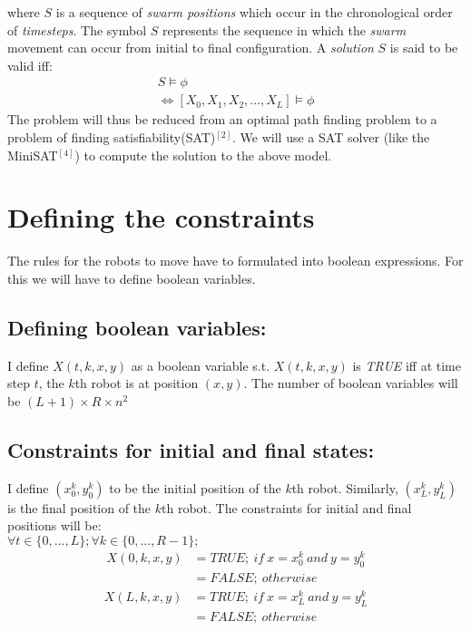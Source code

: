 \documentclass{article}[11pt]
\begin{document}
		where $S$ is a sequence of \textit{swarm positions} which occur in the chronological order of \textit{timesteps}.
		The symbol $S$ represents the sequence in which the \textit{swarm} movement can occur from initial to final configuration.
		A \textit{solution} $S$ is said to be valid iff:
		\begin{gather}
				S \models \phi \\
			\Leftrightarrow  [X_0, X_1, X_2, . . . , X_L] \models \phi
		\end{gather}
		The problem will thus be reduced from an optimal path finding problem to a problem of finding satisfiability(SAT)$^{[2]}$. 
		We will use a SAT solver (like the MiniSAT$^{[4]}$) to compute the solution to the above model.

	\section{Defining the constraints}
		The rules for the robots to move have to formulated into boolean expressions. For this we will have to define boolean variables.
		\subsection{Defining boolean variables:}
			I define $X(t, k, x, y)$ as a boolean variable s.t. $X(t, k, x, y)$ is \textit{TRUE} iff at time step $t$, the $k$th robot is at position $(x,y)$. The number of boolean variables will be $(L+1) \times R \times n^2$
		
		\subsection{Constraints for initial and final states:}
			I define $(x_0^k,y_0^k)$ to be the initial position of the $k$th robot.
			Similarly, $(x_L^k, y_L^k)$ is the final position of the $k$th robot.
			The constraints for initial and final positions will be: \\
			$\forall{t \in \{0,...,L\}};\forall{k \in \{0,...,R-1\}};$
			\begin{equation*}
			\begin{split}
				X(0, k, x, y) &= TRUE;\ if \ x = x_0^k \ and \ y=y_0^k\\
				                                    &= FALSE;\ otherwise
			\end{split}
			\end{equation*}
			\begin{equation*}
			\begin{split}
				X(L, k, x, y) &= TRUE;\ if \ x = x_L^k \ and \ y=y_L^k \\
				                                    &= FALSE;\ otherwise
			\end{split}
			\end{equation*}
\end{document}
